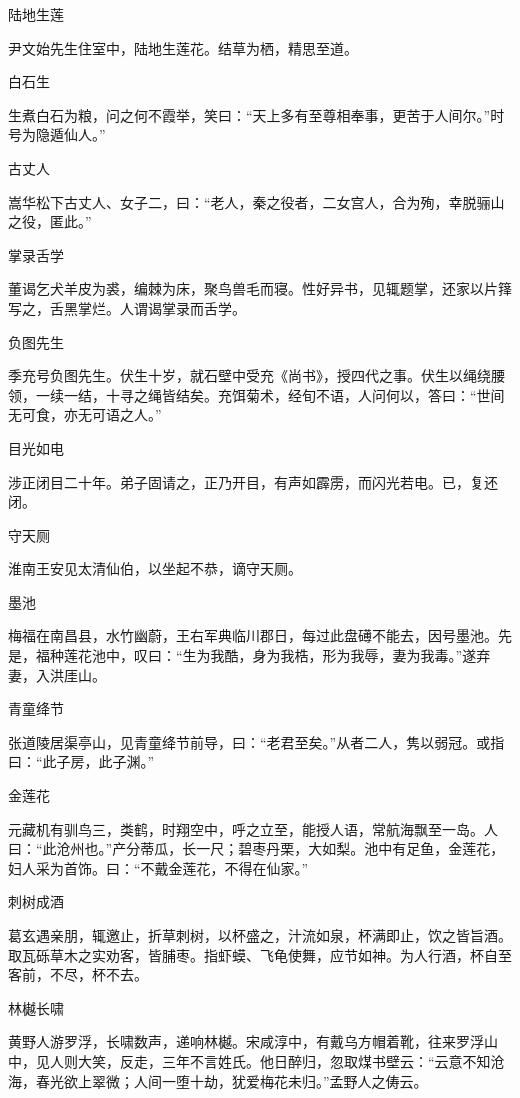 \documentclass[a4paper,12pt,UTF8,twoside]{ctexbook}
\begin{document}
    陆地生莲
    
    尹文始先生住室中，陆地生莲花。结草为栖，精思至道。
    
    白石生
    
    生煮白石为粮，问之何不霞举，笑曰：“天上多有至尊相奉事，更苦于人间尔。”时号为隐遁仙人。”
    
    古丈人
    
    嵩华松下古丈人、女子二，曰：“老人，秦之役者，二女宫人，合为殉，幸脱骊山之役，匿此。”
    
    掌录舌学
    
    董谒乞犬羊皮为裘，编棘为床，聚鸟兽毛而寝。性好异书，见辄题掌，还家以片箨写之，舌黑掌烂。人谓谒掌录而舌学。
    
    负图先生
    
    季充号负图先生。伏生十岁，就石壁中受充《尚书》，授四代之事。伏生以绳绕腰领，一续一结，十寻之绳皆结矣。充饵菊术，经旬不语，人问何以，答曰：“世间无可食，亦无可语之人。”
    
    目光如电
    
    涉正闭目二十年。弟子固请之，正乃开目，有声如霹雳，而闪光若电。已，复还闭。
    
    守天厕
    
    淮南王安见太清仙伯，以坐起不恭，谪守天厕。
    
    墨池
    
    梅福在南昌县，水竹幽蔚，王右军典临川郡日，每过此盘礡不能去，因号墨池。先是，福种莲花池中，叹曰：“生为我酷，身为我梏，形为我辱，妻为我毒。”遂弃妻，入洪厓山。
    
    青童绛节
    
    张道陵居渠亭山，见青童绛节前导，曰：“老君至矣。”从者二人，隽以弱冠。或指曰：“此子房，此子渊。”
    
    金莲花
    
    元藏机有驯鸟三，类鹤，时翔空中，呼之立至，能授人语，常航海飘至一岛。人曰：“此沧州也。”产分蒂瓜，长一尺；碧枣丹栗，大如梨。池中有足鱼，金莲花，妇人采为首饰。曰：“不戴金莲花，不得在仙家。”
    
    刺树成酒
    
    葛玄遇亲朋，辄邀止，折草刺树，以杯盛之，汁流如泉，杯满即止，饮之皆旨酒。取瓦砾草木之实劝客，皆脯枣。指虾蟆、飞龟使舞，应节如神。为人行酒，杯自至客前，不尽，杯不去。
    
    林樾长啸
    
    黄野人游罗浮，长啸数声，递响林樾。宋咸淳中，有戴乌方帽着靴，往来罗浮山中，见人则大笑，反走，三年不言姓氏。他日醉归，忽取煤书壁云：“云意不知沧海，春光欲上翠微；人间一堕十劫，犹爱梅花未归。”孟野人之俦云。
    
\end{document}
